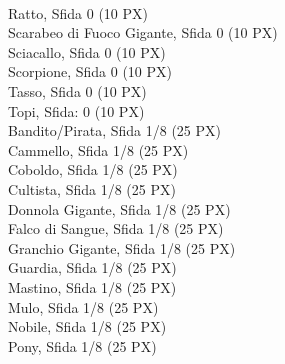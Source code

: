 \begin{multicols}{3}
{%
{}\\
Ratto, Sfida 0 (10 PX)\\
Scarabeo di Fuoco Gigante, Sfida 0 (10 PX)\\
Sciacallo, Sfida 0 (10 PX)\\
Scorpione, Sfida 0 (10 PX)\\
Tasso, Sfida 0 (10 PX)\\
Topi, Sfida: 0 (10 PX)\\
Bandito/Pirata, Sfida 1/8 (25 PX)\\
Cammello, Sfida 1/8 (25 PX)\\
Coboldo, Sfida 1/8 (25 PX)\\
Cultista, Sfida 1/8 (25 PX)\\
Donnola Gigante, Sfida 1/8 (25 PX)\\
Falco di Sangue, Sfida 1/8 (25 PX)\\
Granchio Gigante, Sfida 1/8 (25 PX)\\
Guardia, Sfida 1/8 (25 PX)\\
Mastino, Sfida 1/8 (25 PX)\\
Mulo, Sfida 1/8 (25 PX)\\
Nobile, Sfida 1/8 (25 PX)\\
Pony, Sfida 1/8 (25 PX)\\
}
\end{multicols}
